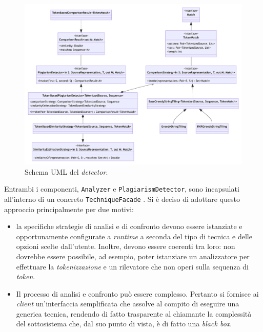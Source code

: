\begin{figure}
    \centering
    \includegraphics[width=\textwidth]{resources/img/02-detector.pdf}
    \caption{Schema UML del \textit{detector}.}
    \label{img:02-detector}
\end{figure}

Entrambi i componenti, \texttt{Analyzer} e \texttt{PlagiarismDetector}, sono incapsulati all'interno di un concreto \texttt{TechniqueFacade} \cite{gof}.
%
Si è deciso di adottare questo approccio principalmente per due motivi:
\begin{itemize}
    \item la specifiche strategie di analisi e di confronto devono essere istanziate e opportunamente configurate a \textit{runtime} a seconda del tipo di tecnica e delle opzioni scelte dall'utente. Inoltre, devono essere coerenti tra loro: non dovrebbe essere possibile, ad esempio, poter istanziare un analizzatore per effettuare la \textit{tokenizzazione} e un rilevatore che non operi sulla sequenza di \textit{token}.
    \item Il processo di analisi e confronto può essere complesso. Pertanto si fornisce ai \textit{client} un'interfaccia semplificata che assolve al compito di eseguire una generica tecnica, rendendo di fatto trasparente al chiamante la complessità del sottosistema che, dal suo punto di vista, è di fatto una \textit{black box}.
\end{itemize}

